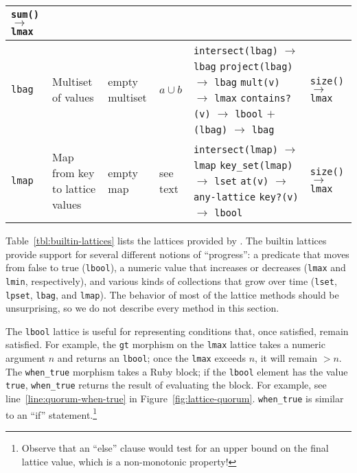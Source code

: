 \begin{table*}[t]
\begin{center}
\begin{tabular}{|l|l|l|l|p{1.59in}|p{1.09in}|}
\texttt{sum()} $\to$ \texttt{lmax} \\
\hline
\texttt{lbag} & Multiset of values & empty multiset & $a \cup b$ &
\texttt{intersect(lbag)} $\to$ \texttt{lbag}\newline
\texttt{project(lbag)} $\to$ \texttt{lbag}\newline
\texttt{mult(v)} $\to$ \texttt{lmax}\newline
\texttt{contains?(v)} $\to$ \texttt{lbool}\newline
\texttt{$\mathtt{+}$(lbag)} $\to$ \texttt{lbag}
& \texttt{size()} $\to$ \texttt{lmax}\\
\hline
\texttt{lmap} & Map from key to lattice values & empty map & see text&
\texttt{intersect(lmap)} $\to$ \texttt{lmap}\newline
\texttt{key\_set(lmap)} $\to$ \texttt{lset}\newline
\texttt{at(v)} $\to$ \texttt{any-lattice}\newline
\texttt{key?(v)} $\to$ \texttt{lbool}
& \texttt{size()} $\to$ \texttt{lmax}\\
\hline
\end{tabular}
\caption{Builtin lattices in \lang. \texttt{v} denotes a Ruby value and
  \texttt{n} denotes a number.}
\label{tbl:builtin-lattices}
\end{center}
\end{table*}


Table~\ref{tbl:builtin-lattices} lists the lattices provided by \lang. The
builtin lattices provide support for several different notions of ``progress'':
a predicate that moves from false to true (\texttt{lbool}), a numeric value that
increases or decreases (\texttt{lmax} and \texttt{lmin}, respectively), and
various kinds of collections that grow over time (\texttt{lset}, \texttt{lpset},
\texttt{lbag}, and \texttt{lmap}). The behavior of most of the lattice methods
should be unsurprising, so we do not describe every method in this section.

The \texttt{lbool} lattice is useful for representing conditions that, once
satisfied, remain satisfied. For example, the \texttt{gt} morphism on the
\texttt{lmax} lattice takes a numeric argument $n$ and returns an
\texttt{lbool}; once the \texttt{lmax} exceeds $n$, it will remain $>n$. The
\texttt{when\_true} morphism takes a Ruby block; if the \texttt{lbool} element
has the value \texttt{true}, \texttt{when\_true} returns the result of
evaluating the block. For example, see line~\ref{line:quorum-when-true} in
Figure~\ref{fig:lattice-quorum}. \texttt{when\_true} is similar to an ``if''
statement.\footnote{Observe that an ``else'' clause would test for an upper bound on the final lattice value, which is a non-monotonic property!}

